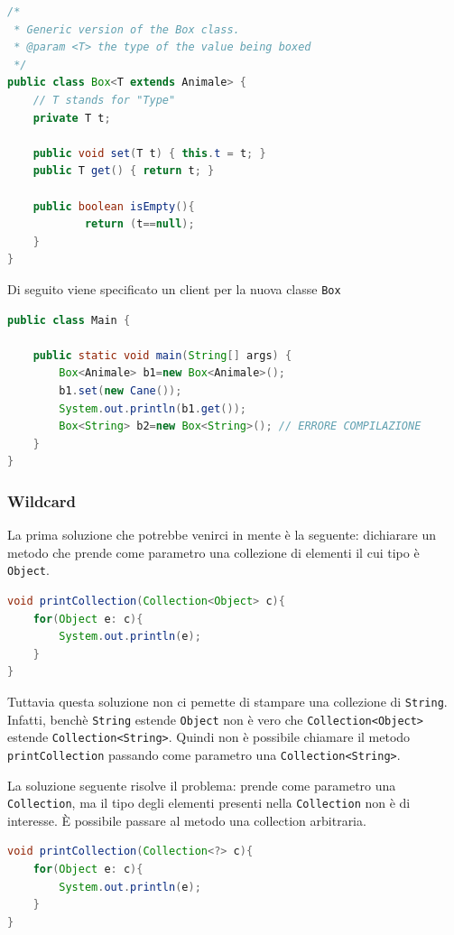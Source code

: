 \documentclass{article}
\begin{document}
\begin{lstlisting}[language=Java]
/*
 * Generic version of the Box class.
 * @param <T> the type of the value being boxed
 */
public class Box<T extends Animale> {
    // T stands for "Type"
    private T t;

    public void set(T t) { this.t = t; }
    public T get() { return t; }
    
    public boolean isEmpty(){
    		return (t==null);
    }
}
\end{lstlisting}

Di seguito viene specificato un client per la nuova classe \texttt{Box}

\begin{lstlisting}[language=Java]
public class Main {

	public static void main(String[] args) {
		Box<Animale> b1=new Box<Animale>();
		b1.set(new Cane());
		System.out.println(b1.get());
		Box<String> b2=new Box<String>(); // ERRORE COMPILAZIONE
	}
}
\end{lstlisting}

\subsubsection{Wildcard}

La prima soluzione che potrebbe venirci in mente \`e la seguente: dichiarare un metodo che prende come parametro una collezione di elementi il cui tipo \`e \texttt{Object}.
\begin{lstlisting}[language=Java]
void printCollection(Collection<Object> c){
    for(Object e: c){
        System.out.println(e);    
    }
}
\end{lstlisting}
 Tuttavia questa soluzione non ci pemette di stampare una collezione di \texttt{String}. Infatti, bench\`e \texttt{String} estende \texttt{Object} non \`e vero che \texttt{Collection<Object>} estende \texttt{Collection<String>}. Quindi non \`e possibile chiamare il metodo \texttt{printCollection} passando come parametro una \texttt{Collection<String>}.

La soluzione seguente risolve il problema: prende come parametro una \texttt{Collection}, ma il tipo degli elementi presenti nella \texttt{Collection} non \`e di interesse. \`E possibile passare al metodo una collection arbitraria.
\begin{lstlisting}[language=Java]
void printCollection(Collection<?> c){
    for(Object e: c){
        System.out.println(e);    
    }
}
\end{lstlisting}
\end{document}
